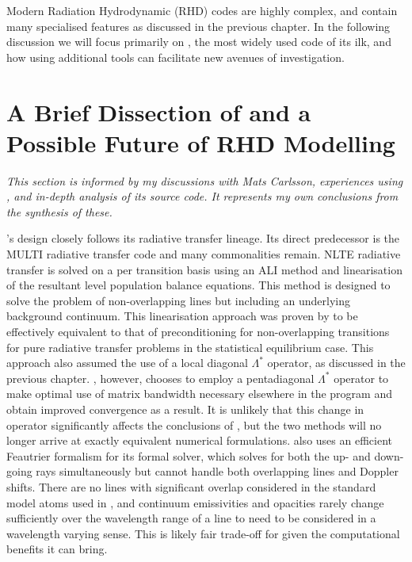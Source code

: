 Modern Radiation Hydrodynamic (RHD) codes are highly complex, and contain many specialised features as discussed in the previous chapter.
In the following discussion we will focus primarily on \Radyn{}, the most widely used code of its ilk, and how using additional tools can facilitate new avenues of investigation.

\section{A Brief Dissection of \Radyn{} and a Possible Future of RHD Modelling}\label{Sec:RadynDissection}

\emph{This section is informed by my discussions with Mats Carlsson, experiences using \Radyn{}, and in-depth analysis of its source code. It represents my own conclusions from the synthesis of these.}

\Radyn{}'s design closely follows its radiative transfer lineage. Its direct predecessor is the MULTI radiative transfer code \citep{Carlsson1992} and many commonalities remain.
NLTE radiative transfer is solved on a per transition basis using an ALI method and linearisation of the resultant level population balance equations.
This method is designed to solve the problem of non-overlapping lines but including an underlying background continuum.
This linearisation approach was proven by \citet{SocasNavarro1997} to be effectively equivalent to that of preconditioning for non-overlapping transitions \citep{Rybicki1991} for pure radiative transfer problems in the statistical equilibrium case.
This approach also assumed the use of a local diagonal $\Lambda^*$ operator, as discussed in the previous chapter.
\Radyn{}, however, chooses to employ a pentadiagonal $\Lambda^*$ operator to make optimal use of matrix bandwidth necessary elsewhere in the program and obtain improved convergence as a result.
It is unlikely that this change in operator significantly affects the conclusions of \citet{SocasNavarro1997}, but the two methods will no longer arrive at exactly equivalent numerical formulations.
\Radyn{} also uses an efficient Feautrier formalism for its formal solver, which solves for both the up- and down-going rays simultaneously but cannot handle both overlapping lines and Doppler shifts.
There are no lines with significant overlap considered in the standard model atoms used in \Radyn{}, and continuum emissivities and opacities rarely change sufficiently over the wavelength range of a line to need to be considered in a wavelength varying sense.
This is likely fair trade-off for \Radyn{} given the computational benefits it can bring.

